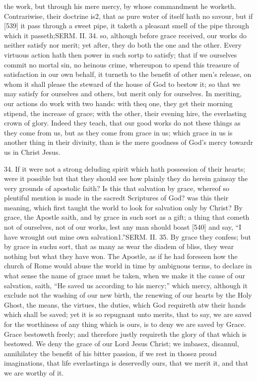 the work, but through his mere mercy, by whose commandment he worketh. Contrariwise, their doctrine is2, that as pure water of itself hath no savour, but if [539] it pass through a sweet pipe, it taketh a pleasant smell of the pipe through which it passeth;SERM. II. 34. so, although before grace received, our works do neither satisfy nor merit; yet after, they do both the one and the other. Every virtuous action hath then power in such sortp to satisfy; that if we ourselves commit no mortal sin, no heinous crime, whereupon to spend this treasure of satisfaction in our own behalf, it turneth to the benefit of other men’s release, on whom it shall please the steward of the house of God to bestow it; so that we may satisfy for ourselves and others, but merit only for ourselves. In meriting, our actions do work with two hands: with theq one, they get their morning stipend, the increase of grace; with the other, their evening hire, the everlasting crown of glory. Indeed they teach, that our good works do not these things as they come from us, but as they come from grace in us; which grace in us is another thing in their divinity, than is the mere goodness of God’s mercy towardr us in Christ Jesus.

34. If it were not a strong deluding spirit which hath possession of their hearts; were it possible but that they should see how plainly they do herein gainsay the very grounds of apostolic faith? Is this that salvation by grace, whereof so plentiful mention is made in the sacredt Scriptures of God? was this their meaning, which first taught the world to look for salvation only by Christ? By grace, the Apostle saith, and by grace in such sort as a gift; a thing that cometh not of ourselves, not of our works, lest any man should boast [540] and say, “I have wrought out mine own salvation1.”SERM. II. 35. By grace they confess; but by grace in suchu sort, that as many as wear the diadem of bliss, they wear nothing but what they have won. The Apostle, as if he had foreseen how the church of Rome would abuse the world in time by ambiguous terms, to declare in what sense the name of grace must be taken, when we make it the cause of our salvation, saith, “He saved us according to his mercy;” which mercy, although it exclude not the washing of our new birth, the renewing of our hearts by the Holy Ghost, the means, the virtues, the duties, which God requireth atw their hands which shall be saved; yet it is so repugnant unto merits, that to say, we are saved for the worthiness of any thing which is ours, is to deny we are saved by Grace. Grace bestoweth freely; and therefore justly requireth the glory of that which is bestowed. We deny the grace of our Lord Jesus Christ; we imbasex, disannul, annihilatey the benefit of his bitter passion, if we rest in thosez proud imaginations, that life everlastinga is deservedly ours, that we merit it, and that we are worthy of it.

